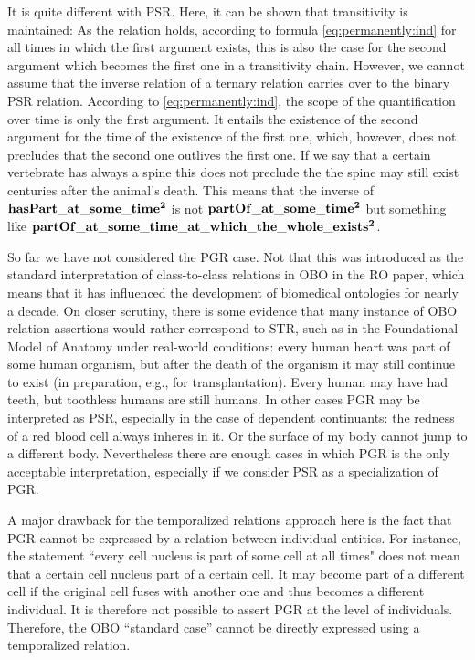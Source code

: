 It is quite different with PSR. Here, it can be shown that transitivity is maintained: As the relation holds, according to formula \ref{eq:permanently:ind} for all times in which the first argument exists, this is also the case for the second argument which becomes the first one in a transitivity chain.
However, we cannot assume that the inverse relation of a ternary relation carries over to the binary PSR relation. According to \ref{eq:permanently:ind}, the scope of the quantification over time is only the first argument. It entails the existence of the second argument for the time of the existence of the first one, which, however, does not precludes that the second one outlives the first one. If we say that a certain vertebrate has always a spine this does not preclude the the spine may still exist centuries after the animal's death.    
This means that the inverse of $\mathrm{\mathbf{hasPart\_at\_some\_time^2}}$ is not $\mathrm{\mathbf{partOf\_at\_some\_time^2}}$ but something like $\mathrm{\mathbf{partOf\_at\_some\_time\_at\_which\_the\_whole\_exists^2}}$.  

So far we have not considered the PGR case. Not that this was introduced as the standard interpretation of class-to-class relations in OBO in the RO paper, which means that it has influenced the development of biomedical ontologies for nearly a decade. On closer scrutiny, there is some evidence that many instance of OBO relation assertions would rather correspond to STR, such as in the Foundational Model of Anatomy under real-world conditions: every human heart was part of some human organism, but after the death of the organism it may still continue to exist (in preparation, e.g., for transplantation). Every human may have had teeth, but toothless humans are still humans. In other cases PGR may be interpreted as PSR, especially in the case of dependent continuants: the redness of a red blood cell always inheres in it. Or the surface of my body cannot jump to a different body. Nevertheless there are enough cases in which PGR is the only acceptable interpretation, especially if we consider PSR as a specialization of PGR.

A major drawback for the temporalized relations approach here is the fact that PGR cannot be expressed by a relation between individual entities. For instance, the statement ``every cell nucleus is part of some cell at all times" does not mean that a certain cell nucleus part of a certain cell. It may become part of a different cell if the original cell fuses with another one and thus becomes a different individual. It is therefore not possible to assert PGR at the level of individuals. Therefore, the OBO ``standard case'' cannot be directly expressed using a temporalized relation.

